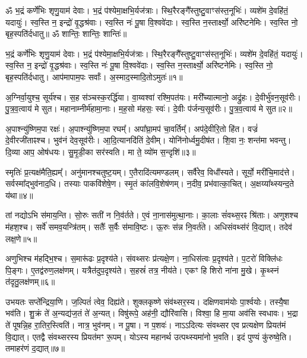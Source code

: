 \setcounter{anuvakam}{0}
\label{sec:startArunaprashna}
ॐ भ॒द्रं कर्णे॑भिः शृणु॒याम॑ देवाः। भ॒द्रं प॑श्येमा॒क्षभि॒र्यज॑त्राः। 
स्थि॒रैरङ्गै᳚स्तुष्टु॒\-वाꣳस॑\-स्त॒नूभिः॑। व्यशे॑म दे॒वहि॑तं॒ यदायुः॑।
स्व॒स्ति न॒ इन्द्रो॑ वृ॒द्धश्र॑वाः। स्व॒स्ति नः॑ पू॒षा वि॒श्ववे॑दाः। 
स्व॒स्ति न॒स्तार्क्ष्यो॒ अरि॑ष्टनेमिः। स्व॒स्ति नो॒ बृह॒स्पति॑र्दधातु॥
ॐ शान्तिः॒ शान्तिः॒ शान्तिः॑॥

भ॒द्रं कर्णे॑भिः शृणु॒याम॑ देवाः। भ॒द्रं प॑श्येमा॒क्षभि॒र्यज॑त्राः। 
स्थि॒रैरङ्गै᳚स्तुष्टु॒\-वाꣳस॑स्त॒नूभिः॑। व्यशे॑म दे॒वहि॑तं॒ यदायुः॑। 
स्व॒स्ति न॒ इन्द्रो॑ वृ॒द्धश्र॑वाः। स्व॒स्ति नः॑ पू॒षा वि॒श्ववे॑दाः। 
स्व॒स्ति न॒स्तार्क्ष्यो॒ अरि॑ष्टनेमिः। स्व॒स्ति नो॒ बृह॒स्पति॑र्दधातु। 
आप॑मापाम॒पः सर्वाः᳚। अ॒स्माद॒स्मादि॒तो\-ऽमुतः॑॥१॥\ip 

अ॒ग्निर्वा॒युश्च॒ सूर्य॑श्च। स॒ह स॑ञ्चस्क॒रर्द्धि॑या। 
वा॒य्वश्वा॑ रश्मि॒पत॑यः। मरी᳚च्यात्मानो॒ अद्रु॑हः। 
दे॒वीर्भु॑वन॒सूव॑रीः। पु॒त्र॒व॒त्वाय॑ मे सुत। 
महानाम्नीर्म॑हा\-मा॒नाः। म॒ह॒सो म॑हसः॒ स्वः॑। 
दे॒वीः प॑र्जन्य॒सूव॑रीः। पु॒त्र॒व॒त्वाय॑ मे सुत॥२॥\ip

अ॒पाश्न्यु॑ष्णिम॒पा रक्षः॑। अ॒पाश्न्यु॑ष्णिम॒पा रघम्᳚। 
अपा᳚घ्रा॒मप॑ चा॒वर्तिम्᳚। अप॑दे॒वीरि॒तो हि॑त। 
वज्रं॑ दे॒वीरजी॑ताꣴश्च। भुव॑नं देव॒सूव॑रीः। 
आ॒दि॒त्यानदि॑तिं दे॒वीम्। योनि॑नोर्ध्वमु॒दीष॑त। 
शि॒वा नः॒ शन्त॑मा भवन्तु। दि॒व्या आप॒ ओष॑धयः। 
सु॒मृ॒डी॒का सर॑स्वति। मा ते॒ व्यो॑म स॒न्दृशि॑॥३॥\ip\anuvakamend


स्मृतिः॑ प्र॒त्यक्ष॑मैति॒ह्यम्᳚। अनु॑मानश्चतुष्ट॒यम्। 
ए॒तैरादि॑त्य\-मण्डलम्। सर्वै॑रेव॒ विधा᳚᳚स्यते। 
सूर्यो॒ मरी॑चि॒माद॑त्ते। सर्वस्मा᳚द्भुव॑ना\-द॒धि। 
तस्याः पाकवि॑शेषे॒ण। स्मृ॒तं का॑ल\-वि॒शेष॑णम्। 
न॒दीव॒ प्रभ॑वात्का॒चित्। अ॒क्षय्या᳚थ्स्यन्द॒ते य॑था॥४॥\ip

तां नद्यो\-ऽभि स॑माय॒न्ति। सो॒रुः सती॑ न नि॒व॑र्तते। 
ए॒वं ना॒नास॑मुत्था॒नाः। का॒लाः सं॑वथ्स॒रꣴ श्रि॑ताः। 
 अणुशश्च म॑हश॒श्च। सर्वे॑ समव॒यन्त्रि॑तम्। 
सतैः᳚ स॒र्वैः स॑मावि॒ष्टः। ऊ॒रुः स॑न्न नि॒वर्त॑ते। 
अधिसंवथ्स॑रं वि॒द्यात्। तदेव॑ लक्ष॒णे॥५॥\ip

अणुभिश्च म॑हद्भि॒श्च। स॒मारू॑ढः प्र॒दृश्य॑ते। 
संवथ्सरः प्र॑त्यक्षे॒ण। ना॒धिस॑त्वः प्र॒दृश्य॑ते। 
प॒टरो॑ विक्लि॑धः पि॒ङ्गः। ए॒तद्व॑रुण॒लक्ष॑णम्। 
यत्रैत॑दुप॒दृश्य॑ते। स॒हस्रं॑ तत्र॒ नीय॑ते। 
एकꣳ हि शिरो ना॑ना मु॒खे। कृ॒थ्स्नं त॑दृतु॒लक्ष॑णम्॥६॥\ip

उभयतः सप्ते᳚न्द्रिया॒णि। ज॒ल्पितं॑ त्वेव॒ दिह्य॑ते। 
शुक्लकृष्णे संव॑थ्सर॒स्य। दक्षिणवाम॑योः पा॒र्श्वयोः। 
तस्यै॒षा भव॑ति। शु॒क्रं ते॑ अ॒न्यद्य॑ज॒तं ते॑ अ॒न्यत्। 
विषु॑रूपे॒ अह॑नी॒ द्यौरि॑वासि। विश्वा॒ हि मा॒या अव॑सि स्वधावः। 
भ॒द्रा ते॑ पूषन्नि॒ह रा॒तिर॒स्त्विति॑। नात्र॒ भुव॑नम्। न पू॒षा। 
न प॒शवः॑। ना\-ऽऽदित्यः संवथ्सर एव प्रत्यक्षेण प्रियत॑मं वि॒द्यात्। 
एतद्वै संवथ्सरस्य प्रियत॑मꣳ रू॒पम्। यो\-ऽस्य महानर्थ उत्पथ्स्यमा॑नो भ॒वति। 
इदं पुण्यं कु॑रुष्वे॒ति। तमाहर॑णं द॒द्यात्॥७॥\ip\anuvakamend


